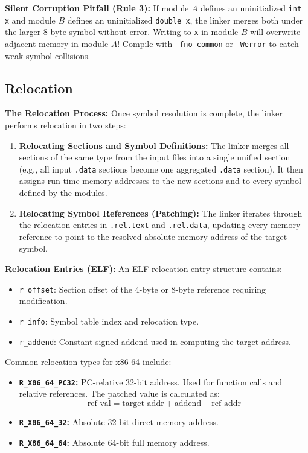 \begin{important}
    \textbf{Silent Corruption Pitfall (Rule 3):} If module $A$ defines an uninitialized \texttt{int x} and module $B$ defines an uninitialized \texttt{double x}, the linker merges both under the larger 8-byte symbol without error. Writing to \texttt{x} in module $B$ will overwrite adjacent memory in module $A$! Compile with \texttt{-fno-common} or \texttt{-Werror} to catch weak symbol collisions.
\end{important}

\subsection{Relocation}

\begin{definition}
    \textbf{The Relocation Process:} Once symbol resolution is complete, the linker performs relocation in two steps:
    \begin{enumerate}
        \item \textbf{Relocating Sections and Symbol Definitions:} The linker merges all sections of the same type from the input files into a single unified section (e.g., all input \texttt{.data} sections become one aggregated \texttt{.data} section). It then assigns run-time memory addresses to the new sections and to every symbol defined by the modules.
        \item \textbf{Relocating Symbol References (Patching):} The linker iterates through the relocation entries in \texttt{.rel.text} and \texttt{.rel.data}, updating every memory reference to point to the resolved absolute memory address of the target symbol.
    \end{enumerate}
\end{definition}

\begin{definition}
    \textbf{Relocation Entries (ELF):} An ELF relocation entry structure contains:
    \begin{itemize}
        \item \texttt{r\_offset}: Section offset of the 4-byte or 8-byte reference requiring modification.
        \item \texttt{r\_info}: Symbol table index and relocation type.
        \item \texttt{r\_addend}: Constant signed addend used in computing the target address.
    \end{itemize}
    Common relocation types for x86-64 include:
    \begin{itemize}
        \item \textbf{\texttt{R\_X86\_64\_PC32}:} PC-relative 32-bit address. Used for function calls and relative references. The patched value is calculated as:
        $$
            \text{ref\_val} = \text{target\_addr} + \text{addend} - \text{ref\_addr}
        $$
        \item \textbf{\texttt{R\_X86\_64\_32}:} Absolute 32-bit direct memory address.
        \item \textbf{\texttt{R\_X86\_64\_64}:} Absolute 64-bit full memory address.
    \end{itemize}
\end{definition}

